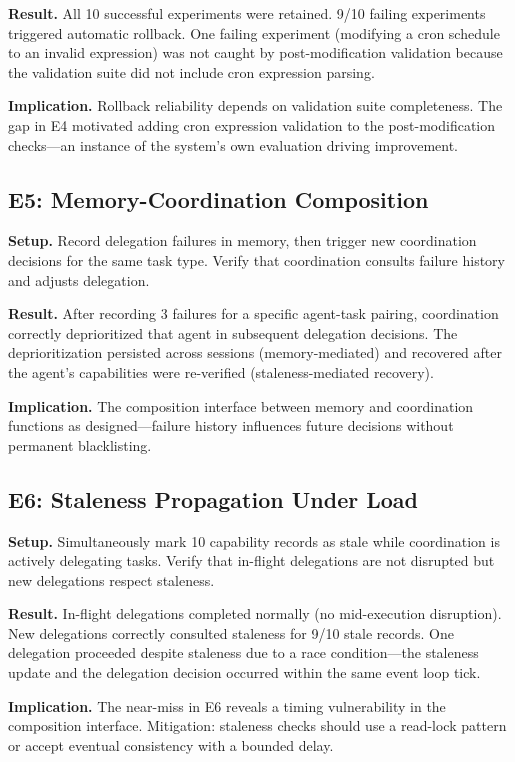 \documentclass[11pt]{article}
\begin{document}
\textbf{Result.} All 10 successful experiments were retained. 9/10 failing experiments triggered automatic rollback. One failing experiment (modifying a cron schedule to an invalid expression) was not caught by post-modification validation because the validation suite did not include cron expression parsing.

\textbf{Implication.} Rollback reliability depends on validation suite completeness. The gap in E4 motivated adding cron expression validation to the post-modification checks---an instance of the system's own evaluation driving improvement.

\subsection{E5: Memory-Coordination Composition}

\textbf{Setup.} Record delegation failures in memory, then trigger new coordination decisions for the same task type. Verify that coordination consults failure history and adjusts delegation.

\textbf{Result.} After recording 3 failures for a specific agent-task pairing, coordination correctly deprioritized that agent in subsequent delegation decisions. The deprioritization persisted across sessions (memory-mediated) and recovered after the agent's capabilities were re-verified (staleness-mediated recovery).

\textbf{Implication.} The composition interface between memory and coordination functions as designed---failure history influences future decisions without permanent blacklisting.

\subsection{E6: Staleness Propagation Under Load}

\textbf{Setup.} Simultaneously mark 10 capability records as stale while coordination is actively delegating tasks. Verify that in-flight delegations are not disrupted but new delegations respect staleness.

\textbf{Result.} In-flight delegations completed normally (no mid-execution disruption). New delegations correctly consulted staleness for 9/10 stale records. One delegation proceeded despite staleness due to a race condition---the staleness update and the delegation decision occurred within the same event loop tick.

\textbf{Implication.} The near-miss in E6 reveals a timing vulnerability in the composition interface. Mitigation: staleness checks should use a read-lock pattern or accept eventual consistency with a bounded delay.
\end{document}
